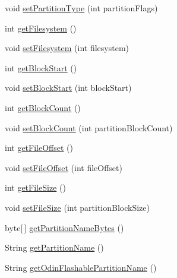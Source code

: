 \begin{DoxyCompactItemize}
\item 
void \hyperlink{class_c_a_s_u_a_l_1_1archiving_1_1libpit_1_1_pit_entry_a6ef40cf9deab75de8c83086b38578353}{set\-Partition\-Type} (int partition\-Flags)
\item 
int \hyperlink{class_c_a_s_u_a_l_1_1archiving_1_1libpit_1_1_pit_entry_a7bd0ed05426235715456a03d85d4add7}{get\-Filesystem} ()
\item 
void \hyperlink{class_c_a_s_u_a_l_1_1archiving_1_1libpit_1_1_pit_entry_aaa4ed31403b52a9d53aeec85e1ff49bd}{set\-Filesystem} (int filesystem)
\item 
int \hyperlink{class_c_a_s_u_a_l_1_1archiving_1_1libpit_1_1_pit_entry_ab2d83a89e4caa5a2396065cc8351b1a4}{get\-Block\-Start} ()
\item 
void \hyperlink{class_c_a_s_u_a_l_1_1archiving_1_1libpit_1_1_pit_entry_ad62d20ea45e2b47741376c567fbf5abb}{set\-Block\-Start} (int block\-Start)
\item 
int \hyperlink{class_c_a_s_u_a_l_1_1archiving_1_1libpit_1_1_pit_entry_a71f70a12ea451e371d05724bf1be8893}{get\-Block\-Count} ()
\item 
void \hyperlink{class_c_a_s_u_a_l_1_1archiving_1_1libpit_1_1_pit_entry_a30bbfb8aad7ebb3e1e67a97a9e0dff39}{set\-Block\-Count} (int partition\-Block\-Count)
\item 
int \hyperlink{class_c_a_s_u_a_l_1_1archiving_1_1libpit_1_1_pit_entry_a18188ca9574796012da0e09c7d0ea26e}{get\-File\-Offset} ()
\item 
void \hyperlink{class_c_a_s_u_a_l_1_1archiving_1_1libpit_1_1_pit_entry_a4196abd6bae4940c3ed5d5a0eb95c6bb}{set\-File\-Offset} (int file\-Offset)
\item 
int \hyperlink{class_c_a_s_u_a_l_1_1archiving_1_1libpit_1_1_pit_entry_a01deff38488725386c61df5a471f174c}{get\-File\-Size} ()
\item 
void \hyperlink{class_c_a_s_u_a_l_1_1archiving_1_1libpit_1_1_pit_entry_a86955e5ab2b342c853cc4b67fe0749b9}{set\-File\-Size} (int partition\-Block\-Size)
\item 
byte\mbox{[}$\,$\mbox{]} \hyperlink{class_c_a_s_u_a_l_1_1archiving_1_1libpit_1_1_pit_entry_aecce239dfd9e37cf3f336e70b246d6cc}{get\-Partition\-Name\-Bytes} ()
\item 
String \hyperlink{class_c_a_s_u_a_l_1_1archiving_1_1libpit_1_1_pit_entry_a59b8dd55f03fa04659a3c2b4d10902f1}{get\-Partition\-Name} ()
\item 
String \hyperlink{class_c_a_s_u_a_l_1_1archiving_1_1libpit_1_1_pit_entry_ac16fbb066452b2dbe3081935eeb44dbc}{get\-Odin\-Flashable\-Partition\-Name} ()

\end{DoxyCompactItemize}
